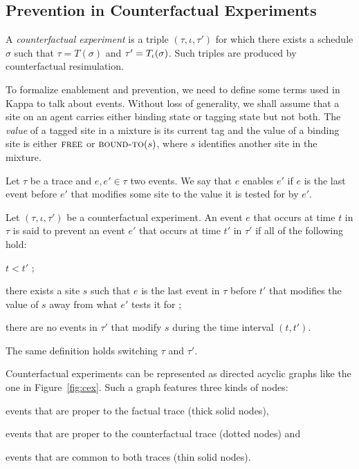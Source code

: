 \subsection{Prevention in Counterfactual Experiments}
\label{subsec:cex}\label{subsec:inhibition}

A \textit{counterfactual experiment} is a triple
$(\tau, \iota, \tau')$ for which there exists a schedule $\sigma$ such
that $\tau = T(\sigma)$ and $\tau' = {T_\iota}{}(\sigma)$. Such triples
are produced by counterfactual resimulation.

To formalize enablement and prevention, we need to define some terms
used in Kappa to talk about events. Without loss of generality, we
shall assume that a site on an agent carries either binding state or
tagging state but not both. The \textit{value} of a tagged site in a
mixture is its current tag and the value of a binding site is either
$\textsc{free}$ or $\textsc{bound-to}(s)$, where $s$ identifies
another site in the mixture.



\begin{definition}[Enablement]
  Let $\tau$ be a trace and $e, e' \in \tau$ two events.  We say that
  $e$ enables $e'$ if $e$ is the last event before $e'$ that modifies
  some site to the value it is tested for by $e'$.
\end{definition}

\begin{definition}[Prevention]
  Let $(\tau, \iota, \tau')$ be a counterfactual experiment. An event
  $e$ that occurs at time $t$ in $\tau$ is said to prevent an event
  $e'$ that occurs at time $t'$ in $\tau'$ if all of the following
  hold:
  \begin{inparaenum}[(1)]
  \item \label{inhibition:time} $t < t'$ ;
  \item \label{inhibition:breaks} there exists a site $s$ such that
    $e$ is the last event in $\tau$ before $t'$ that modifies the
    value of $s$ away from what $e'$ tests it for ;
  \item \label{inhibition:nointf} there are no events in $\tau'$ that
    modify $s$ during the time interval $(t, t')$.
  \end{inparaenum}
  The same definition holds switching $\tau$ and $\tau'$.
\end{definition}

Counterfactual experiments can be represented as directed acyclic
graphs like the one in Figure~\ref{fig:cex}. Such a graph features
three kinds of nodes:
\begin{inparaenum}[]
\item events that are proper to the factual trace (thick solid nodes),
\item events that are proper to the counterfactual trace (dotted
  nodes) and
\item events that are common to both traces (thin solid nodes).
\end{inparaenum}

